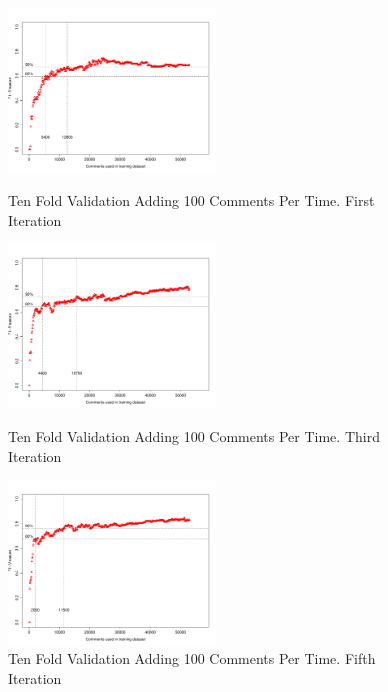 \clearpage
\begin{figure}[thb!]
  \centering
  \vspace{-3mm}
  \includegraphics[width=0.49\textwidth]{figures/appendix/ten_fold_validation_requirement/ten_fold_validation_0_100.pdf}
  \vspace{-5mm}
  \caption{Ten Fold Validation Adding 100 Comments Per Time. First Iteration}
  \label{fig:requirement_ten_fold_validation_0_100}
  \includegraphics[width=0.49\textwidth]{figures/appendix/ten_fold_validation_requirement/ten_fold_validation_2_100.pdf}
  \vspace{-5mm}
  \caption{Ten Fold Validation Adding 100 Comments Per Time. Third Iteration}
  \label{fig:requirement_ten_fold_validation_2_100}
  \includegraphics[width=0.49\textwidth]{figures/appendix/ten_fold_validation_requirement/ten_fold_validation_4_100.pdf}
  \vspace{-5mm}
  \caption{Ten Fold Validation Adding 100 Comments Per Time. Fifth Iteration}
  \label{fig:requirement_ten_fold_validation_4_100}
\end{figure}

